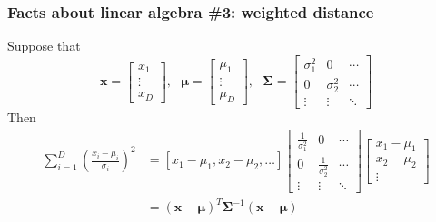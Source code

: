 \documentclass{beamer}
\begin{document}
\begin{frame}
  \frametitle{Facts about linear algebra \#3: weighted distance}

  Suppose that
  \begin{displaymath}
    \mathbf{x}=\left[\begin{array}{c}x_1\\\vdots\\x_D\end{array}\right],~~~
    \bm{\mu}=\left[\begin{array}{c}\mu_1\\\vdots\\\mu_D\end{array}\right],~~~
    \mathbf{\Sigma}=\left[\begin{array}{ccc}\sigma_1^2&0&\cdots\\
        0&\sigma_2^2&\cdots\\\vdots&\vdots&\ddots\end{array}\right]    
  \end{displaymath}
  Then
  \begin{align*}
    \sum_{i=1}^D\left(\frac{x_i-\mu_i}{\sigma_i}\right)^2
    &=
        [x_1-\mu_1,x_2-\mu_2,\ldots]
        \left[\begin{array}{ccc}\frac{1}{\sigma_1^2}&0&\cdots\\
            0&\frac{1}{\sigma_2^2}&\cdots\\\vdots&\vdots&\ddots\end{array}\right]
        \left[\begin{array}{c}x_1-\mu_1\\x_2-\mu_2\\\vdots\end{array}\right]\\
        &=(\mathbf{x}-\bm{\mu})^T\mathbf{\Sigma}^{-1}(\mathbf{x}-\bm{\mu})
  \end{align*}
\end{frame}
\end{document}
